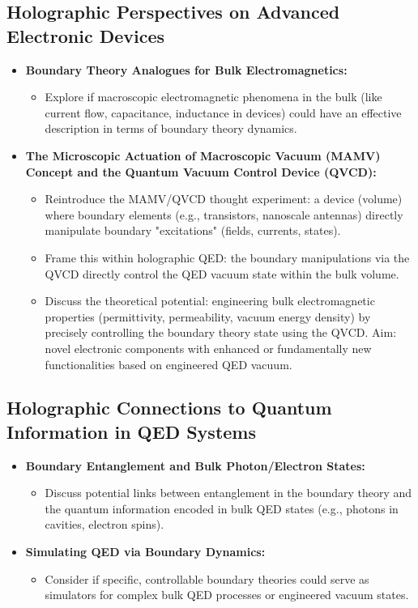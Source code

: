 \documentclass{amsart}
\begin{document}
\begin{itemize}
\subsection{Holographic Perspectives on Advanced Electronic Devices}
\begin{itemize}
    \item \textbf{Boundary Theory Analogues for Bulk Electromagnetics:}
        \begin{itemize}
            \item Explore if macroscopic electromagnetic phenomena in the bulk (like current flow, capacitance, inductance in devices) could have an effective description in terms of boundary theory dynamics.
        \end{itemize}
    \item \textbf{The Microscopic Actuation of Macroscopic Vacuum (MAMV) Concept and the Quantum Vacuum Control Device (QVCD):}
        \begin{itemize}
            \item Reintroduce the MAMV/QVCD thought experiment: a device (volume) where boundary elements (e.g., transistors, nanoscale antennas) directly manipulate boundary "excitations" (fields, currents, states).
            \item Frame this within holographic QED: the boundary manipulations via the QVCD directly control the QED vacuum state within the bulk volume.
            \item Discuss the theoretical potential: engineering bulk electromagnetic properties (permittivity, permeability, vacuum energy density) by precisely controlling the boundary theory state using the QVCD. Aim: novel electronic components with enhanced or fundamentally new functionalities based on engineered QED vacuum.
        \end{itemize}
\end{itemize}

\subsection{Holographic Connections to Quantum Information in QED Systems}
\begin{itemize}
    \item \textbf{Boundary Entanglement and Bulk Photon/Electron States:}
        \begin{itemize}
            \item Discuss potential links between entanglement in the boundary theory and the quantum information encoded in bulk QED states (e.g., photons in cavities, electron spins).
        \end{itemize}
    \item \textbf{Simulating QED via Boundary Dynamics:}
        \begin{itemize}
            \item Consider if specific, controllable boundary theories could serve as simulators for complex bulk QED processes or engineered vacuum states.
        \end{itemize}
\end{itemize}


\end{itemize}
\end{document}
